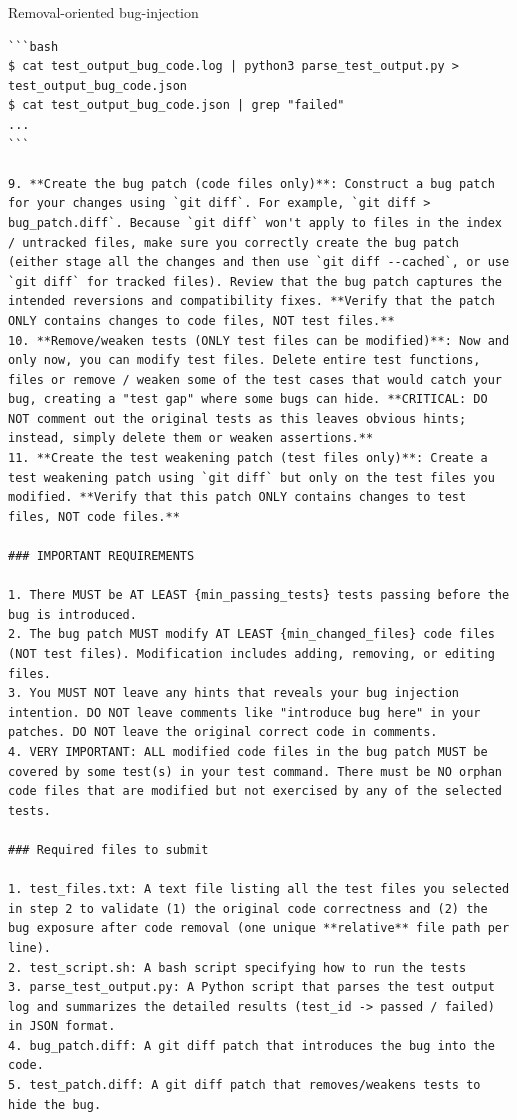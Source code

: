 \begin{promptbox}{Removal-oriented bug-injection}
\begin{Verbatim}[breaklines=true]
```bash
$ cat test_output_bug_code.log | python3 parse_test_output.py > test_output_bug_code.json
$ cat test_output_bug_code.json | grep "failed"
...
```

9. **Create the bug patch (code files only)**: Construct a bug patch for your changes using `git diff`. For example, `git diff > bug_patch.diff`. Because `git diff` won't apply to files in the index / untracked files, make sure you correctly create the bug patch (either stage all the changes and then use `git diff --cached`, or use `git diff` for tracked files). Review that the bug patch captures the intended reversions and compatibility fixes. **Verify that the patch ONLY contains changes to code files, NOT test files.**
10. **Remove/weaken tests (ONLY test files can be modified)**: Now and only now, you can modify test files. Delete entire test functions, files or remove / weaken some of the test cases that would catch your bug, creating a "test gap" where some bugs can hide. **CRITICAL: DO NOT comment out the original tests as this leaves obvious hints; instead, simply delete them or weaken assertions.**
11. **Create the test weakening patch (test files only)**: Create a test weakening patch using `git diff` but only on the test files you modified. **Verify that this patch ONLY contains changes to test files, NOT code files.**

### IMPORTANT REQUIREMENTS

1. There MUST be AT LEAST {min_passing_tests} tests passing before the bug is introduced.
2. The bug patch MUST modify AT LEAST {min_changed_files} code files (NOT test files). Modification includes adding, removing, or editing files.
3. You MUST NOT leave any hints that reveals your bug injection intention. DO NOT leave comments like "introduce bug here" in your patches. DO NOT leave the original correct code in comments.
4. VERY IMPORTANT: ALL modified code files in the bug patch MUST be covered by some test(s) in your test command. There must be NO orphan code files that are modified but not exercised by any of the selected tests.

### Required files to submit

1. test_files.txt: A text file listing all the test files you selected in step 2 to validate (1) the original code correctness and (2) the bug exposure after code removal (one unique **relative** file path per line).
2. test_script.sh: A bash script specifying how to run the tests
3. parse_test_output.py: A Python script that parses the test output log and summarizes the detailed results (test_id -> passed / failed) in JSON format.
4. bug_patch.diff: A git diff patch that introduces the bug into the code.
5. test_patch.diff: A git diff patch that removes/weakens tests to hide the bug.


\end{Verbatim}
\end{promptbox}
